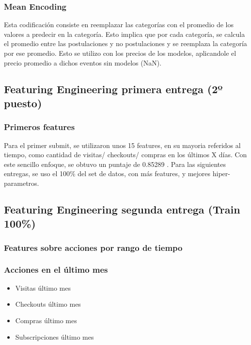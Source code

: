 \documentclass[a4paper ,12pt]{article}
\begin{document}
\subsubsection{Mean Encoding}
Esta codificación consiste en reemplazar las categorías con el
promedio de los valores a predecir en la categoría. Esto implica que por cada categoría, se calcula el promedio entre las postulaciones y no postulaciones y se
reemplaza la categoría por ese promedio. Esto se utilizo con los precios de los modelos, aplicandole el precio promedio a dichos eventos sin modelos (NaN).

\subsection{Featuring Engineering primera entrega (2º puesto)}

\subsubsection{Primeros features}
Para el primer submit, se utilizaron unos 15 features, en su mayoria referidos al tiempo, como cantidad de visitas/ checkouts/ compras en los últimos X días. Con este sencillo enfoque, se obtuvo un puntaje de 0.85289 . Para las siguientes entregas, se uso el 100\% del set de datos, con más features, y mejores hiper-parametros. 

\subsection{Featuring Engineering segunda entrega (Train 100\%)}

\subsubsection{ Features sobre acciones por rango de tiempo }

		
		\subsubsection{Acciones en el último mes}
	
		\begin{itemize}
		 	
		\item Visitas último mes
		
		\item Checkouts último mes
		
		\item Compras último mes
		
		\item Subscripciones último mes
		\end{itemize}
		
\end{document}
